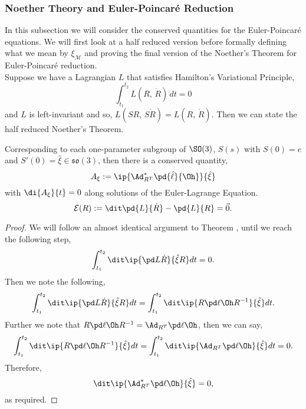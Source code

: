 \subsubsection{Noether Theory and Euler-Poincar\'e Reduction}
In this subsection we will consider the conserved quantities for the Euler-Poincar\'e equations. We will first look at a half reduced version before formally defining what we mean by $\xi_\mathcal{M}$ and proving the final version of the Noether's Theorem for Euler-Poincar\'e reduction.\\

\noindent
Suppose we have a Lagrangian $L$ that satisfies Hamilton's Variational Principle,
$$ \int_{t_1}^{t_2} L(R,\,\dot R)\,dt = 0 $$
and $L$ is left-invariant and so, $L(SR,\,S\dot R) = L(R,\,\dot R)$. Then we can state the half reduced Noether's Theorem.
\begin{nthm}
  Corresponding to each one-parameter subgroup of $\SO(3)$, $S(s)$ with $S(0)= e$ and $S'(0) = \hat\xi \in \mathfrak{so}(3)$, then there is a conserved quantity,
  $$ A_\xi := \ip{\Ad^*_{R^T}\pd{\hat\ell}{\Oh}}{\hat\xi} $$
  with $\di{A_\xi}{t} = 0$ along solutions of the Euler-Lagrange Equation.
  $$ \mathcal{E}(R) := \dit\pd{L}{\dot R} - \pd{L}{R} = \vec 0. $$
\end{nthm}
\begin{proof}
  We will follow an almost identical argument to Theorem , until we reach the following step,
  \begin{align*}
    \int_{t_1}^{t_2} \dit \ip{\pd L {\dot R}}{\hat\xi R}dt = 0.
  \end{align*}
  \noindent
  Then we note the following,
  $$ \int_{t_1}^{t_2} \dit \ip{\pd L {\dot R}}{\hat\xi R}dt = \int_{t_1}^{t_2} \dit \ip{R\pd \ell {\Oh}R^{-1}}{\hat\xi}dt. $$
  Further we note that $R\pd \ell {\Oh}R^{-1} = \Ad_{R^T}\pd \ell \Oh$, then we can say,
  $$ \int_{t_1}^{t_2} \dit \ip{R\pd \ell {\Oh}R^{-1}}{\hat\xi}dt = \int_{t_1}^{t_2} \dit \ip{\Ad_{R^T}\pd \ell \Oh}{\hat\xi}dt = 0. $$
  Therefore,
  $$ \dit \ip{\Ad_{R^T}^*\pd \ell \Oh}{\hat\xi} = 0, $$
  as required.
\end{proof}


